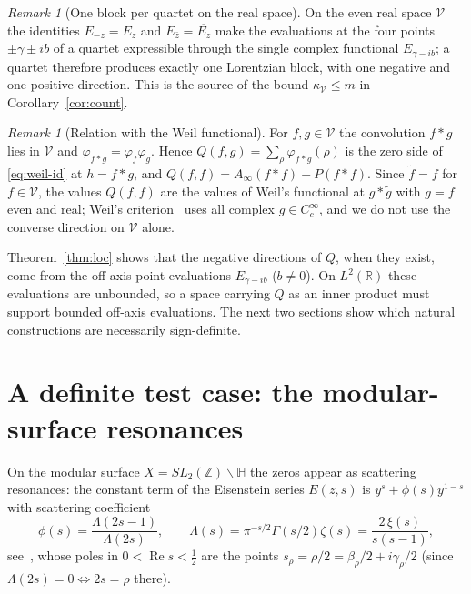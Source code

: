 \documentclass[11pt]{amsart}
\theoremstyle{definition}
\theoremstyle{remark}
\newtheorem{remark}[theorem]{Remark}
\renewcommand{\Re}{\operatorname{Re}}
\newcommand{\half}{\tfrac12}
\newcommand{\kV}{\kappa_{\mathcal V}}
\begin{document}
\begin{remark}[One block per quartet on the real space]\label{rem:two-blocks}
On the even real space $\mathcal V$ the identities $E_{-z}=E_z$ and
$E_{\bar z}=\overline{E_z}$ make the evaluations at the four points $\pm\gamma\pm ib$ of a quartet
expressible through the single complex functional $E_{\gamma-ib}$; a quartet therefore produces
exactly one Lorentzian block, with one negative and one positive direction. This is the source of
the bound $\kV\le m$ in Corollary~\ref{cor:count}.
\end{remark}

\begin{remark}[Relation with the Weil functional]\label{rem:choices}
For $f,g\in\mathcal V$ the convolution $f*g$ lies in $\mathcal V$ and
$\varphi_{f*g}=\varphi_f\varphi_g$. Hence $Q(f,g)=\sum_\rho\varphi_{f*g}(\rho)$ is the zero side
of \eqref{eq:weil-id} at $h=f*g$, and $Q(f,f)=A_\infty(f*f)-P(f*f)$. Since $\tilde f=f$ for
$f\in\mathcal V$, the values $Q(f,f)$ are the values of Weil's functional at $g*\tilde g$ with
$g=f$ even and real; Weil's criterion~\cite{Weil,Bombieri} uses all complex $g\in C_c^\infty$, and
we do not use the converse direction on $\mathcal V$ alone.
\end{remark}

Theorem~\ref{thm:loc} shows that the negative directions of $Q$, when they exist, come from the
off-axis point evaluations $E_{\gamma-ib}$ ($b\ne0$). On $L^2(\mathbb R)$ these evaluations are
unbounded, so a space carrying $Q$ as an inner product must support bounded off-axis evaluations.
The next two sections show which natural constructions are necessarily sign-definite.

\section{A definite test case: the modular-surface resonances}\label{sec:modular}

On the modular surface $X=SL_2(\mathbb Z)\backslash\mathbb H$ the zeros appear as scattering
resonances: the constant term of the Eisenstein series $E(z,s)$ is $y^s+\phi(s)y^{1-s}$ with
scattering coefficient
\[
\phi(s)=\frac{\Lambda(2s-1)}{\Lambda(2s)},\qquad
\Lambda(s)=\pi^{-s/2}\Gamma(s/2)\zeta(s)=\frac{2\,\xi(s)}{s(s-1)},
\]
see~\cite{Iwaniec}, whose poles in $0<\Re s<\half$ are the points
$s_\rho=\rho/2=\beta_\rho/2+i\gamma_\rho/2$ (since $\Lambda(2s)=0\iff2s=\rho$ there).
\end{document}
